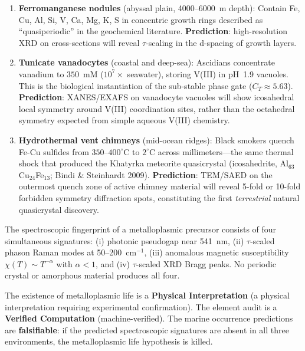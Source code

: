 \begin{enumerate}
    \item \textbf{Ferromanganese nodules} (abyssal plain, 4000--6000~m depth): Contain Fe, Cu, Al, Si, V, Ca, Mg, K, S in concentric growth rings described as ``quasiperiodic'' in the geochemical literature. \textbf{Prediction}: high-resolution XRD on cross-sections will reveal $\tau$-scaling in the d-spacing of growth layers.
    
    \item \textbf{Tunicate vanadocytes} (coastal and deep-sea): Ascidians concentrate vanadium to $350$~mM ($10^7\times$ seawater), storing V(III) in pH~1.9 vacuoles. This is the biological instantiation of the sub-stable phase gate ($C_T \approx 5.63$). \textbf{Prediction}: XANES/EXAFS on vanadocyte vacuoles will show icosahedral local symmetry around V(III) coordination sites, rather than the octahedral symmetry expected from simple aqueous V(III) chemistry.
    
    \item \textbf{Hydrothermal vent chimneys} (mid-ocean ridges): Black smokers quench Fe-Cu sulfides from $350$--$400^\circ$C to $2^\circ$C across millimeters---the same thermal shock that produced the Khatyrka meteorite quasicrystal (icosahedrite, Al$_{63}$Cu$_{24}$Fe$_{13}$; Bindi \& Steinhardt 2009). \textbf{Prediction}: TEM/SAED on the outermost quench zone of active chimney material will reveal 5-fold or 10-fold forbidden symmetry diffraction spots, constituting the first \emph{terrestrial} natural quasicrystal discovery.
\end{enumerate}

\noindent The spectroscopic fingerprint of a metalloplasmic precursor consists of four simultaneous signatures: (i) photonic pseudogap near 541~nm, (ii) $\tau$-scaled phason Raman modes at 50--200~cm$^{-1}$, (iii) anomalous magnetic susceptibility $\chi(T) \sim T^{-\alpha}$ with $\alpha < 1$, and (iv) $\tau$-scaled XRD Bragg peaks. No periodic crystal or amorphous material produces all four.

\begin{remark}[Scope]
The existence of metalloplasmic life is a \textbf{Physical Interpretation} (a physical interpretation requiring experimental confirmation). The element audit is a \textbf{Verified Computation} (machine-verified). The marine occurrence predictions are \textbf{falsifiable}: if the predicted spectroscopic signatures are absent in all three environments, the metalloplasmic life hypothesis is killed.
\end{remark}

